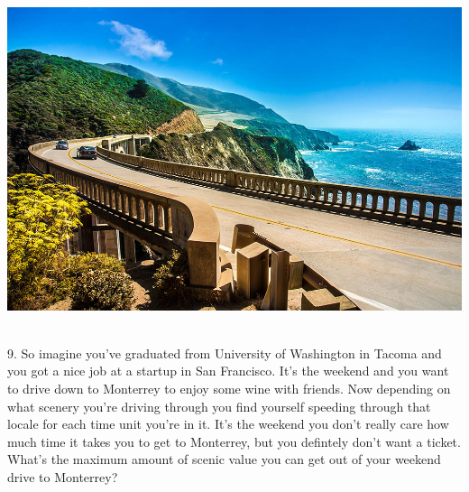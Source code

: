 \documentclass[12pt]{article}
\begin{document}
\noindent \centerline{\includegraphics[scale = 1.25]{brix.jpg}}\\
9. So imagine you've graduated from University of Washington
in Tacoma and you got a nice job at a startup in San Francisco. It's the weekend
and you want to drive down to Monterrey to enjoy some wine with friends.
Now depending on what scenery you're driving through you find yourself
speeding through that locale for each time unit you're in it. It's the weekend
you don't really care how much time it takes you to get to Monterrey, but you
defintely don't want a ticket. What's the maximum amount of scenic value you can get
out of your weekend drive to Monterrey?
\end{document}

